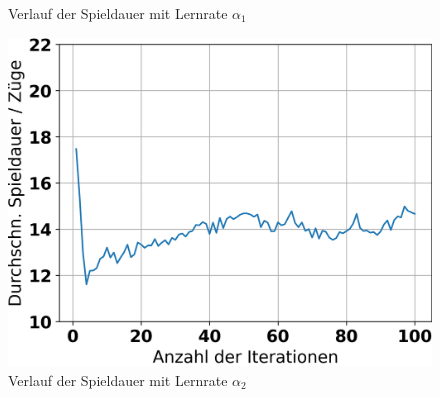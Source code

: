 \begin{figure}[H]
\begin{minipage}[c]{0.32\linewidth}
		\caption{Verlauf der Spieldauer mit Lernrate $\alpha_1$}
	\end{minipage}
	\hfill
	\begin{minipage}[c]{0.32\linewidth}
		\includegraphics[width=\linewidth]{Bilder/ensemble-training/c_0_0001/graph_game_lengths.png}
		\caption{Verlauf der Spieldauer mit Lernrate $\alpha_2$}
	\end{minipage}
\end{figure}


